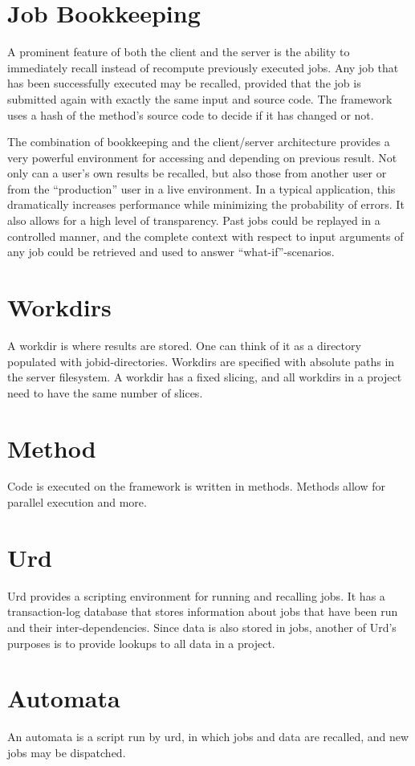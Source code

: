 \section{Job Bookkeeping}

A prominent feature of both the client and the server is the ability
to immediately recall instead of recompute previously executed jobs.
Any job that has been successfully executed may be recalled, provided
that the job is submitted again with exactly the same input and source
code.  The framework uses a hash of the method's source code to decide
if it has changed or not.

The combination of bookkeeping and the client/server architecture
provides a very powerful environment for accessing and depending on
previous result.  Not only can a user's own results be recalled, but
also those from another user or from the ``production'' user in a live
environment.  In a typical application, this dramatically increases
performance while minimizing the probability of errors.  It also
allows for a high level of transparency.  Past jobs could be replayed
in a controlled manner, and the complete context with respect to input
arguments of any job could be retrieved and used to answer
``what-if''-scenarios.




\section{Workdirs}

A workdir is where results are stored.  One can think of it as a
directory populated with jobid-directories.  Workdirs are specified
with absolute paths in the server filesystem.  A workdir has a fixed
slicing, and all workdirs in a project need to have the same number of
slices.


\section{Method}

Code is executed on the framework is written in methods.  Methods
allow for parallel execution and more.



\section{Urd}

Urd provides a scripting environment for running and recalling jobs.
It has a transaction-log database that stores information about jobs
that have been run and their inter-dependencies.  Since data is also
stored in jobs, another of Urd's purposes is to provide lookups to all
data in a project.



\section{Automata}

An automata is a script run by urd, in which jobs and data are
recalled, and new jobs may be dispatched.
